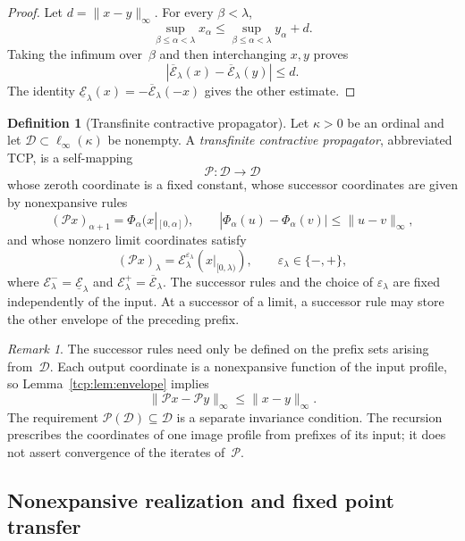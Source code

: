 \documentclass[preprint,12pt,nopreprintline]{elsarticle}
\theoremstyle{definition}
\newtheorem{definition}[theorem]{Definition}
\theoremstyle{remark}
\newtheorem{remark}[theorem]{Remark}
\numberwithin{equation}{section}
\begin{document}
\begin{proof}
Let $d=\|x-y\|_\infty$. For every $\beta<\lambda$,
\[
 \sup_{\beta\le\alpha<\lambda}x_\alpha\le \sup_{\beta\le\alpha<\lambda}y_\alpha+d.
\]
Taking the infimum over~$\beta$ and then interchanging $x,y$ proves
\[
|\overline{\mathcal E}_\lambda(x)-\overline{\mathcal E}_\lambda(y)|\le d.
\]
The identity $\underline{\mathcal E}_\lambda(x) =-\overline{\mathcal E}_\lambda(-x)$ gives the other estimate.
\end{proof}

\begin{definition}[Transfinite contractive propagator]
\label{tcp:def:propagator}
Let $\kappa>0$ be an ordinal and let $\mathcal D\subset\ell_\infty(\kappa)$ be nonempty. A \emph{transfinite contractive propagator}, abbreviated TCP, is a self-mapping
\[
\mathscr P:\mathcal D\longrightarrow\mathcal D 
\]
whose zeroth coordinate is a fixed constant, whose successor coordinates are given by nonexpansive rules
\[
 (\mathscr Px)_{\alpha+1}=\Phi_\alpha\bigl(x|_{[0,\alpha]}\bigr),\qquad|\Phi_\alpha(u)-\Phi_\alpha(v)|\le\|u-v\|_\infty,
\]
and whose nonzero limit coordinates satisfy
\[
 (\mathscr Px)_\lambda
 =\mathcal E^{\varepsilon_\lambda}_\lambda
      (x|_{[0,\lambda)}),
 \qquad \varepsilon_\lambda\in\{-,+\},
\]
where $\mathcal E^-_\lambda=\underline{\mathcal E}_\lambda$ and $\mathcal E^+_\lambda=\overline{\mathcal E}_\lambda$.
The successor rules and the choice of $\varepsilon_\lambda$ are fixed independently of the input. At a successor of a limit, a
successor rule may store the other envelope of the preceding prefix.
\end{definition}

\begin{remark}
\label{tcp:rem:propagator-metric}
The successor rules need only be defined on the prefix sets arising from~$\mathcal D$. Each output coordinate is a nonexpansive function of the input profile, so Lemma~\ref{tcp:lem:envelope} implies
\[
 \|\mathscr Px-\mathscr Py\|_\infty\le\|x-y\|_\infty.
\]
The requirement $\mathscr P(\mathcal D)\subseteq\mathcal D$ is a separate invariance condition. The recursion prescribes the coordinates of one image profile from prefixes of its input; it does not assert convergence of the iterates of~$\mathscr P$.
\end{remark}

\subsection{Nonexpansive realization and fixed point transfer}
\label{tcp:subsec:transfer}
\end{document}
